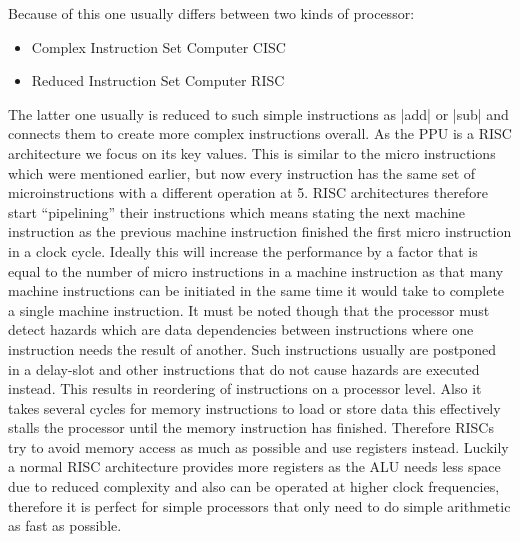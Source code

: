 Because of this one usually differs between two kinds of processor:
\begin{itemize}
    \item Complex Instruction Set Computer CISC
    \item Reduced Instruction Set Computer RISC
\end{itemize}
The latter one usually is reduced to such simple instructions as |add| or |sub| and connects them to create more complex instructions overall.
As the PPU is a RISC architecture we focus on its key values.
This is similar to the micro instructions which were mentioned earlier, but now every instruction has the same set of microinstructions with a different operation at 5.
RISC architectures therefore start ``pipelining'' their instructions which means stating the next machine instruction as the previous machine instruction finished the first micro instruction in a clock cycle.
Ideally this will increase the performance by a factor that is equal to the number of micro instructions in a machine instruction as that many machine instructions can be initiated in the same time it would take to complete a single machine instruction.
It must be noted though that the processor must detect hazards which are data dependencies between instructions where one instruction needs the result of another.
Such instructions usually are postponed in a delay-slot and other instructions that do not cause hazards are executed instead.
This results in reordering of instructions on a processor level.
Also it takes several cycles for memory instructions to load or store data this effectively stalls the processor until the memory instruction has finished.
Therefore RISCs try to avoid memory access as much as possible and use registers instead.
Luckily a normal RISC architecture provides more registers as the ALU needs less space due to reduced complexity and also can be operated at higher clock frequencies, therefore it is perfect for simple processors that only need to do simple arithmetic as fast as possible.

